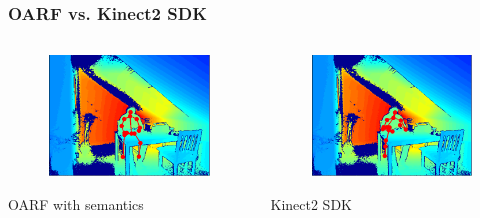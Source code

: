 \documentclass[xcolor=dvipsnames]{beamer}
\begin{document}
\begin{frame}
\frametitle{OARF vs. Kinect2 SDK}
	\begin{columns}
		\begin{column}{.5\textwidth}
			\begin{figure}
				\includegraphics[width=\textwidth]{img/res1.png}
			\end{figure}
			\begin{center}
				OARF with semantics
			\end{center}
		\end{column}
		\begin{column}{.5\textwidth}
			\begin{figure}
				\includegraphics[width=\textwidth]{img/res3.png}
			\end{figure}
			\begin{center}
				Kinect2 SDK
			\end{center}
		\end{column}
	\end{columns}
\end{frame}
\end{document}
